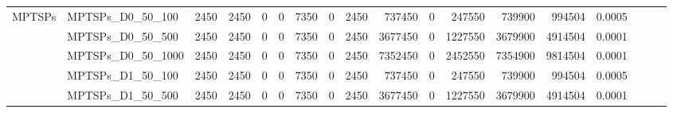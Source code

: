 \begin{landscape}
\begin{longtable}[c]{llrrrrrrrrrrrrrlll}
		\multirow{24}{*}{MPTSPs}    & MPTSPs\_D0\_50\_100          & 2450                        & 2450                       & 0                          & 0                           & 7350                       & 0                          & 2450                       & 737450                    & 0                         & 247550                     & 739900                     & 994504                         & 0.0005                        &                          &                          &                          \\
		& MPTSPs\_D0\_50\_500          & 2450                        & 2450                       & 0                          & 0                           & 7350                       & 0                          & 2450                       & 3677450                   & 0                         & 1227550                    & 3679900                    & 4914504                        & 0.0001                        &                          &                          &                          \\
		& MPTSPs\_D0\_50\_1000         & 2450                        & 2450                       & 0                          & 0                           & 7350                       & 0                          & 2450                       & 7352450                   & 0                         & 2452550                    & 7354900                    & 9814504                        & 0.0001                        &                          &                          &                          \\
		& MPTSPs\_D1\_50\_100          & 2450                        & 2450                       & 0                          & 0                           & 7350                       & 0                          & 2450                       & 737450                    & 0                         & 247550                     & 739900                     & 994504                         & 0.0005                        &                          &                          &                          \\
		& MPTSPs\_D1\_50\_500          & 2450                        & 2450                       & 0                          & 0                           & 7350                       & 0                          & 2450                       & 3677450                   & 0                         & 1227550                    & 3679900                    & 4914504                        & 0.0001                        &                          &                          &                          \\

\end{longtable}
\end{landscape}
